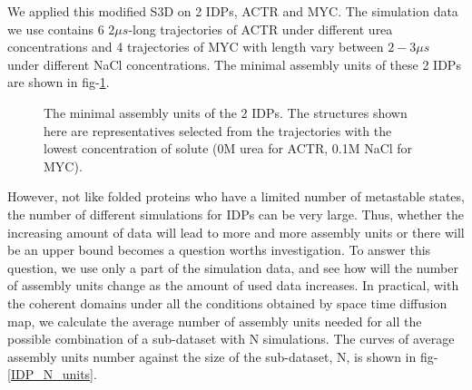 \documentclass[12pt]{article}
\begin{document}
\setlength{\parindent}{2em}

We applied this modified S3D on 2 IDPs, ACTR and MYC. The simulation data we use contains 6 $2\mu s$-long trajectories of ACTR under different urea concentrations\cite{ACTR} and 4 trajectories of MYC with length vary between $2-3\mu s$ under different NaCl concentrations\cite{MYC}. The minimal assembly units of these 2 IDPs are shown in fig-\ref{IDP_all_beads}. 

\begin{figure}[htbp]
  \centering
  \caption{\label{IDP_all_beads}The minimal assembly units of the 2 IDPs. The structures shown here are representatives selected from the trajectories with the lowest concentration of solute (0M urea for ACTR, 0.1M NaCl for MYC).}
\end{figure}

However, not like folded proteins who have a limited number of metastable states, the number of different simulations for IDPs can be very large. Thus, whether the increasing amount of data will lead to more and more assembly units or there will be an upper bound becomes a question worths investigation. To answer this question, we use only a part of the simulation data, and see how will the number of assembly units change as the amount of used data increases. In practical, with the coherent domains under all the conditions obtained by space time diffusion map, we calculate the average number of assembly units needed for all the possible combination of a sub-dataset with N simulations. The curves of average assembly units number against the size of the sub-dataset, N, is shown in fig-\ref{IDP_N_units}. 
\end{document}
